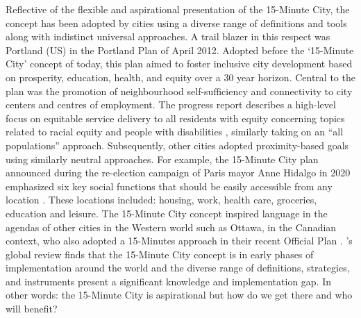 \documentclass[
  authoryear,
  preprint,
  3p]{elsarticle}
\begin{document}
Reflective of the flexible and aspirational presentation of the
15-Minute City, the concept has been adopted by cities using a diverse
range of definitions and tools along with indistinct universal
approaches. A trail blazer in this respect was Portland (US) in the
Portland Plan \citep{city_of_portland_20minute_2010} of April 2012.
Adopted before the `15-Minute City' concept of today, this plan aimed to
foster inclusive city development based on prosperity, education,
health, and equity over a 30 year horizon. Central to the plan was the
promotion of neighbourhood self-sufficiency and connectivity to city
centers and centres of employment. The progress report describes a
high-level focus on equitable service delivery to all residents with
equity concerning topics related to racial equity and people with
disabilities \citep{portland_government_portland_2017}, similarly taking
on an ``all populations'' approach. Subsequently, other cities adopted
proximity-based goals using similarly neutral approaches. For example,
the 15-Minute City plan announced during the re-election campaign of
Paris mayor Anne Hidalgo in 2020 emphasized six key social functions
that should be easily accessible from any location
\citep{ville_de_paris_paris_2022}. These locations included: housing,
work, health care, groceries, education and leisure. The 15-Minute City
concept inspired language in the agendas of other cities in the Western
world such as Ottawa, in the Canadian context, who also adopted a
15-Minutes approach in their recent Official Plan
\citep{ville_dottawa_quartier_2021}.
\citet{teixeiraClassifying15minuteCities2024}'s global review finds that
the 15-Minute City concept is in early phases of implementation around
the world and the diverse range of definitions, strategies, and
instruments present a significant knowledge and implementation gap. In
other words: the 15-Minute City is aspirational but how do we get there
and who will benefit?
\end{document}

